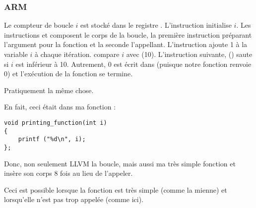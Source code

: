\subsubsection{ARM}

\myparagraph{\NonOptimizingKeilVI (\ARMMode)}



Le compteur de boucle $i$ est stocké dans le registre .
L'instruction  initialise $i$.
Les instructions  et  composent le corps
de la boucle, la première instruction préparant l'argument pour la fonction \ttf
et la seconde l'appellant.
L'instruction  ajoute 1 à la variable $i$ à chaque itération.
 compare $i$ avec  (10). 
L'instruction suivante,  () saute si $i$ est inférieur
à 10.
Autrement, 0 est écrit dans  (puisque notre fonction renvoie 0) et l'exécution
de la fonction se termine.

\myparagraph{\OptimizingKeilVI (\ThumbMode)}



Pratiquement la même chose.

\myparagraph{\OptimizingXcodeIV (\ThumbTwoMode)}
\label{ARM_unrolled_loops}



En fait, ceci était dans ma fonction \ttf:

\begin{lstlisting}[style=customc]
void printing_function(int i)
{
    printf ("%d\n", i);
};
\end{lstlisting}

Donc, non seulement LLVM  la boucle, mais aussi  ma très
simple fonction et insère son corps 8 fois au lieu de l'appeler.

Ceci est possible lorsque la fonction est très simple (comme la mienne) et lorsqu'elle
n'est pas trop appelée (comme ici).






